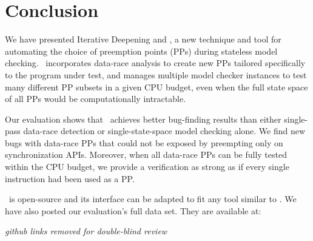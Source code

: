 \documentclass[pldi]{sigplanconf-pldi15}
\begin{document}

\section{Conclusion}
\label{sec:conclusion}


We have presented Iterative Deepening and \quicksand, a new technique and tool for automating the choice of preemption points (PPs) during stateless model checking.
\quicksand~incorporates data-race analysis to create new PPs tailored specifically to the program under test,
and manages multiple model checker instances to test many different PP subsets in a given CPU budget, even when the full state space of all PPs would be computationally intractable.

Our evaluation shows that \quicksand~achieves better bug-finding results than either single-pass data-race detection or single-state-space model checking alone.
We find new bugs with data-race PPs that could not be exposed by preempting only on synchronization APIs.
Moreover, when all data-race PPs can be fully tested within the CPU budget, we provide a verification as strong as if every single instruction had been used as a PP.

\quicksand~is open-source and its interface can be adapted to fit any tool similar to \landslide.
We have also posted our evaluation's full data set. %
They are available at:


{\em github links removed for double-blind review}
%
\end{document}
